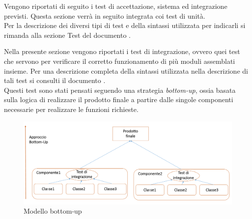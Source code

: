 	Vengono riportati di seguito i test di accettazione, sistema ed integrazione previsti. Questa sezione verrà in seguito integrata coi test di unità.\\
	Per la descrizione dei diversi tipi di test e della sintassi utilizzata per indicarli si rimanda alla sezione Test del documento .
	
	
		Nella presente sezione vengono riportati i test di integrazione, ovvero quei test che servono per verificare il corretto funzionamento di più moduli assemblati insieme. Per una descrizione completa della sintassi utilizzata nella descrizione di tali test si consulti il documento . \\
		Questi test sono stati pensati seguendo una strategia \textit{bottom-up}, ossia basata sulla logica di realizzare il prodotto finale a partire dalle singole componenti necessarie per realizzare le funzioni richieste.
		\begin{figure}[H]
			\centering
			\includegraphics[scale=0.4]{PianoDiQualifica/Pics/bottom-up.png}
			\caption{Modello bottom-up}
		\end{figure}
			
			
			
			
